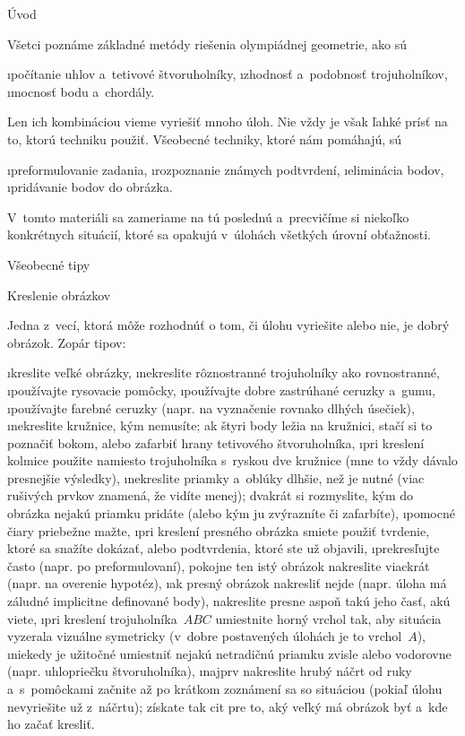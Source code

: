 

\let\angle\sphericalangle





\sec Úvod

Všetci poznáme základné metódy riešenia olympiádnej geometrie, ako sú

\begitems
\i počítanie uhlov a~tetivové štvoruholníky,
\i zhodnosť a~podobnosť trojuholníkov,
\i mocnosť bodu a~chordály.
\enditems

Len ich kombináciou vieme vyriešiť mnoho úloh. Nie vždy je však ľahké prísť na to, ktorú techniku použiť. Všeobecné techniky, ktoré nám pomáhajú, sú

\begitems
\i preformulovanie zadania,
\i rozpoznanie známych podtvrdení,
\i eliminácia bodov,
\i pridávanie bodov do obrázka.
\enditems

V~tomto materiáli sa zameriame na tú poslednú a~precvičíme si niekoľko konkrétnych situácií, ktoré sa opakujú v~úlohách všetkých úrovní obťažnosti.

\sec Všeobecné tipy

\secc Kreslenie obrázkov

Jedna z~vecí, ktorá môže rozhodnúť o tom, či úlohu vyriešite alebo nie, je dobrý obrázok. Zopár tipov:

\begitems
\i kreslite veľké obrázky,
\i nekreslite rôznostranné trojuholníky ako rovnostranné,
\i používajte rysovacie pomôcky,
\i používajte dobre zastrúhané ceruzky a~gumu,
\i používajte farebné ceruzky (napr. na vyznačenie rovnako dlhých úsečiek),
\i nekreslite kružnice, kým nemusíte; ak štyri body ležia na kružnici, stačí si to poznačiť bokom, alebo zafarbiť hrany tetivového štvoruholníka,
\i pri kreslení kolmice použite namiesto trojuholníka s~ryskou dve kružnice (mne to vždy dávalo presnejšie výsledky),
\i nekreslite priamky a~oblúky dlhšie, než je nutné (viac rušivých prvkov znamená, že vidíte menej); dvakrát si rozmyslite, kým do obrázka nejakú priamku pridáte (alebo kým ju zvýrazníte či zafarbíte),
\i pomocné čiary priebežne mažte,
\i pri kreslení presného obrázka smiete použiť tvrdenie, ktoré sa snažíte dokázať, alebo podtvrdenia, ktoré ste už objavili,
\i prekresľujte často (napr. po preformulovaní), pokojne ten istý obrázok nakreslite viackrát (napr. na overenie hypotéz),
\i ak presný obrázok nakresliť nejde (napr. úloha má záludné implicitne definované body), nakreslite presne aspoň takú jeho časť, akú viete,
\i pri kreslení trojuholníka~$ABC$ umiestnite horný vrchol tak, aby situácia vyzerala vizuálne symetricky (v~dobre postavených úlohách je to vrchol~$A$),
\i niekedy je užitočné umiestniť nejakú netradičnú priamku zvisle alebo vodorovne (napr. uhlopriečku štvoruholníka),
\i najprv nakreslite hrubý náčrt od ruky a~s~pomôckami začnite až po krátkom zoznámení sa so situáciou (pokiaľ úlohu nevyriešite už z~náčrtu); získate tak cit pre to, aký veľký má obrázok byť a~kde ho začať kresliť.
\enditems

